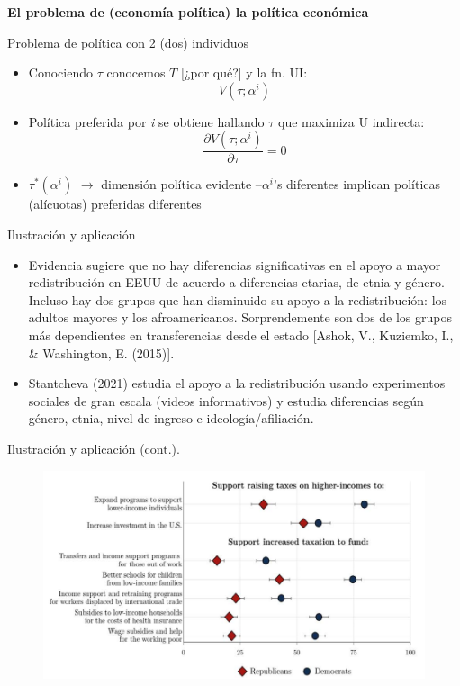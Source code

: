 \documentclass[
  ignorenonframetext,
]{beamer}
\providecommand{\tightlist}{%
  \setlength{\itemsep}{0pt}\setlength{\parskip}{0pt}}\usepackage{longtable,booktabs,array}
\begin{document}
\begin{frame}{\textbf{El problema de (economía política) la política
económica}}
\begin{block}{Problema de política con 2 (dos) individuos}
\protect\hypertarget{problema-de-poluxedtica-con-2-dos-individuos-2}{}
\begin{itemize}
\tightlist
\item
  Conociendo \(\tau\) conocemos \(T\) {[}¿por qué?{]} y la fn. UI:
  \[V(\tau;\alpha^{i})\]
\item
  Política preferida por \emph{i} se obtiene hallando \(\tau\) que
  maximiza U indirecta:
  \[\frac{\partial V(\tau;\alpha^{i})}{\partial \tau}=0\]
\item
  \(\tau^{*}(\alpha^{i})\) \(\longrightarrow\) dimensión política
  evidente --\(\alpha^{i}\)'s diferentes implican políticas (alícuotas)
  preferidas diferentes
\end{itemize}
\end{block}

\begin{block}{Ilustración y aplicación}
\protect\hypertarget{ilustraciuxf3n-y-aplicaciuxf3n}{}
\begin{itemize}
\tightlist
\item
  Evidencia sugiere que no hay diferencias significativas en el apoyo a
  mayor redistribución en EEUU de acuerdo a diferencias etarias, de
  etnia y género. Incluso hay dos grupos que han disminuido su apoyo a
  la redistribución: los adultos mayores y los afroamericanos.
  Sorprendemente son dos de los grupos más dependientes en
  transferencias desde el estado {[}Ashok, V., Kuziemko, I., \&
  Washington, E. (2015){]}.
\item
  Stantcheva (2021) estudia el apoyo a la redistribución usando
  experimentos sociales de gran escala (videos informativos) y estudia
  diferencias según género, etnia, nivel de ingreso e
  ideología/afiliación.
\end{itemize}
\end{block}

\begin{block}{Ilustración y aplicación (cont.).}
\protect\hypertarget{ilustraciuxf3n-y-aplicaciuxf3n-cont..}{}
\begin{figure}

{\centering \includegraphics{../epol/fig/fig-02-001.png}

}
\end{figure}
\end{block}
\end{frame}
\end{document}
